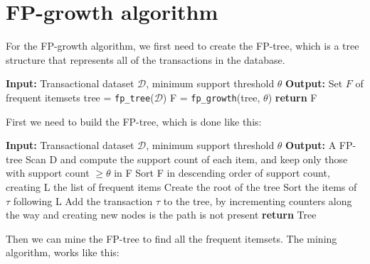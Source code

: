 \documentclass[12pt, openany]{report}
\theoremstyle{definition}
\begin{document}
\section{FP-growth algorithm}
For the FP-growth algorithm, we first need to create the FP-tree, which is a tree structure that represents all of the transactions in the database.
\begin{algorithm}[H]
    \caption{\texttt{fp\_growth}($\mathcal{D}$, $\theta$)}
    \begin{algorithmic}[1]
        \State \textbf{Input:} Transactional dataset $\mathcal{D}$, minimum support threshold $\theta$
        \State \textbf{Output:} Set $F$ of frequent itemsets
        \State tree = \texttt{fp\_tree}($\mathcal{D}$)
        \State F = \texttt{fp\_growth}(tree, $\theta$)
        \State \textbf{return} F
    \end{algorithmic}
\end{algorithm}
First we need to build the FP-tree, which is done like this:
\begin{algorithm}[H]
    \caption{\texttt{fp\_tree}($\mathcal{D}$, $\theta$)}
    \begin{algorithmic}[1]
        \State \textbf{Input:} Transactional dataset $\mathcal{D}$, minimum support threshold $\theta$
        \State \textbf{Output:} A FP-tree
        \State Scan D and compute the support count of each item, and keep only those with support count $\geq \theta$ in F
        \State Sort F in descending order of support count, creating L the list of frequent items
        \State Create the root of the tree
            \State Sort the items of $\tau$ following L
            \State Add the transaction $\tau$ to the tree, by incrementing counters along the way and creating new nodes is the path is not present
        \EndFor
        \State \textbf{return} Tree
    \end{algorithmic}
\end{algorithm}
Then we can mine the FP-tree to find all the frequent itemsets. The mining algorithm, works like this:
\end{document}

